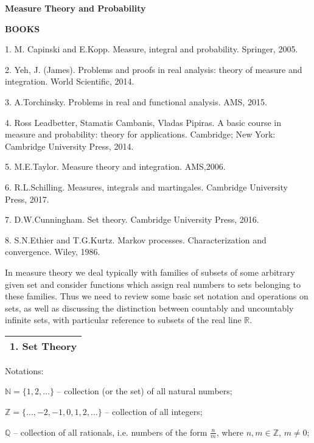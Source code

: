 \documentclass[a4paper,10pt]{article}
\def\NN{\mathbb{N}}
\def\ZZ{\mathbb{Z}}
\def\RR{\mathbb{R}}
\def\QQ{\mathbb{Q}}
\newcommand{\1}[1]{\mathbf{1}_{\{#1\}}}
\begin{document}
\begin{center} \bf \LARGE Measure Theory and Probability \end{center}\vspace{3mm}

\Large {\bf BOOKS}

1. M. Capinski and E.Kopp. Measure, integral and probability. Springer, 2005.

2. Yeh, J. (James). Problems and proofs in real analysis: theory of measure and integration. World Scientific, 2014.

3. A.Torchinsky. Problems in real and functional analysis. AMS, 2015.

4. Ross Leadbetter, Stamatis Cambanis, Vladas Pipiras. A basic course in measure and probability: theory for applications. Cambridge; New York: Cambridge University Press, 2014.

5. M.E.Taylor. Measure theory and integration. AMS,2006.

6. R.L.Schilling. Measures, integrals and martingales.  Cambridge University Press, 2017.

7. D.W.Cunningham. Set theory. Cambridge University Press, 2016.

8. S.N.Ethier and T.G.Kurtz. Markov processes. Characterization and convergence. Wiley, 1986.
\vspace{5mm}



In measure theory we deal typically with families of subsets of some arbitrary given set and consider functions which assign real numbers to sets belonging to these families. Thus we need to review some basic set notation and operations on sets, as well as discussing the distinction between countably and uncountably infinite sets, with particular reference to subsets of the real line $\RR$.\vspace{5mm}

\begin{tabular}{|l|}
\hline {\LARGE\bf 1. Set Theory}\\
\hline\end{tabular}
\vspace{5mm}

Notations:

$\NN=\{1,2,\ldots\}$ -- collection (or the set) of all natural numbers;

$\ZZ=\{\ldots, -2,-1,0,1,2,\ldots\}$ -- collection of all integers;

$\QQ$ -- collection of all rationals, i.e. numbers of the form $\frac{n}{m}$, where $n,m\in\ZZ$, $m\ne 0$;
\end{document}
